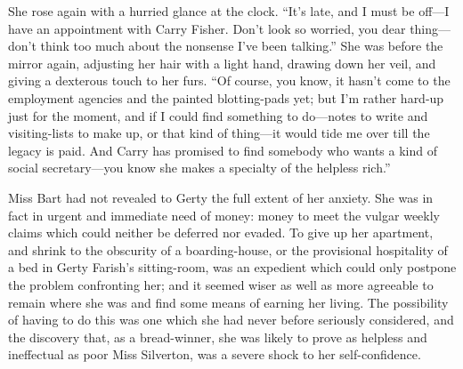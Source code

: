 \documentclass[12pt,a4paper]{book}
\begin{document}
She rose again with a hurried glance at the clock. ``It's late,
and I must be off---I have an appointment with Carry Fisher. Don't
look so worried, you dear thing---don't think too much about the
nonsense I've been talking.'' She was before the mirror again,
adjusting her hair with a light hand, drawing down her veil, and
giving a dexterous touch to her furs. ``Of course, you know, it
hasn't come to the employment agencies and the painted
blotting-pads yet; but I'm rather hard-up just for the moment,
and if I could find something to do---notes to write and
visiting-lists to make up, or that kind of thing---it would tide
me over till the legacy is paid. And Carry has promised to find
somebody who wants a kind of social secretary---you know she makes
a specialty of the helpless rich.''








Miss Bart had not revealed to Gerty the full extent of her
anxiety. She was in fact in urgent and immediate need of money: 
money to meet the vulgar weekly claims which could neither be
deferred nor evaded. To give up her apartment, and shrink to the
obscurity of a boarding-house, or the provisional hospitality of
a bed in Gerty Farish's sitting-room, was an expedient which
could only postpone the problem confronting her; and it seemed
wiser as well as more agreeable to remain where she was and find
some means of earning her living. The possibility of having to do
this was one which she had never before seriously considered, and
the discovery that, as a bread-winner, she was likely to prove as
helpless and ineffectual as poor Miss Silverton, was a severe
shock to her self-confidence.
\end{document}
